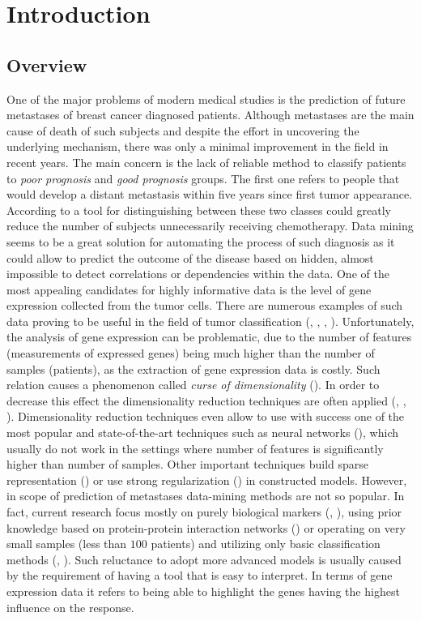 \documentclass[shortabstract, english, mgr]{iithesis}
\author{Stanisław Wilczyński}
\begin{document}
\chapter{Introduction} \label{section:intro}

\section{Overview}
One of the major problems of modern medical studies is the prediction of future metastases of breast cancer diagnosed patients. Although metastases are the main cause of death of such subjects and despite the effort in uncovering the underlying mechanism, there was only a minimal improvement in the field in recent years. The main concern is the lack of reliable method to classify patients to \textit{poor prognosis} and \textit{good prognosis} groups. The first one refers to people that would develop a distant metastasis within five years since first tumor appearance. According to \cite{Metastasis1} a tool for distinguishing between these two classes could greatly reduce the number of subjects unnecessarily receiving chemotherapy. Data mining seems to be a great solution for automating the process of such diagnosis as it could allow to predict the outcome of the disease based on hidden, almost impossible to detect correlations or dependencies within the data. One of the most appealing candidates for highly informative data is the level of gene expression collected from the tumor cells. There are numerous examples of such data proving to be useful in the field of tumor classification (\cite{BreastCancerClassification}, \cite{TumorMolecularClass}, \cite{TumorsClass1}, \cite{TumorClass2}). Unfortunately, the analysis of gene expression can be problematic, due to the number of features (measurements of expressed genes) being much higher than the number of samples (patients), as the extraction of gene expression data is costly. Such relation causes a phenomenon called \textit{curse of dimensionality} (\cite[p. 22-26]{ESL2}). In order to decrease this effect the dimensionality reduction techniques are often applied (\cite{MasterArts}, \cite{TumorClass4}, \cite{TumorPLS}). Dimensionality reduction techniques even allow to use with success one of the most popular and state-of-the-art techniques such as neural networks (\cite{fDNN}), which usually do not work in the settings where number of features is significantly higher than number of samples. Other important techniques build sparse representation (\cite{TumorClass3}) or use strong regularization (\cite[p. 649-666]{ESL2}) in constructed models. However, in scope of prediction of metastases data-mining methods are not so popular. In fact, current research focus mostly on purely biological markers (\cite{Metastasis4}, \cite{dataOrigin}), using prior knowledge based on protein-protein interaction networks (\cite{MetastasisScores}) or operating on very small samples (less than $100$ patients) and utilizing only basic classification methods (\cite{Metastasis1}, \cite{Metastasis2}). Such reluctance to adopt more advanced models is usually caused by the requirement of having a tool that is easy to interpret. In terms of gene expression data it refers to being able to highlight the genes having the highest influence on the response.
\end{document}
